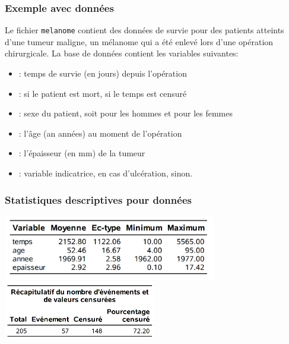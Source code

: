 \documentclass{beamer}
\begin{document}
\begin{frame}
\frametitle{Exemple avec données }
Le fichier \texttt{melanome} contient des données de survie pour des patients atteints d'une tumeur maligne, un mélanome qui a été enlevé lors d'une opération chirurgicale. La base de données contient les variables suivantes:


{ \footnotesize
\begin{itemize}
\itemsep0em 
\item {}: temps de survie (en jours) depuis l'opération 
\item {}:  si le patient est mort,  si le temps est censuré
\item {}: sexe du patient, soit  pour les hommes et  pour les femmes
\item {}: l'âge (an années) au moment de l'opération
\item {}: l'épaisseur (en mm) de la tumeur
\item {}: variable indicatrice,  en cas d'ulcération,  sinon.
\end{itemize}
}

\end{frame}

\begin{frame}
\frametitle{Statistiques descriptives pour données }
\begin{center}
\includegraphics[width = 0.7\textwidth]{img/c7/diapos7e10}
\includegraphics[width = 0.5\textwidth]{img/c7/diapos7e11}
\end{center}
\end{frame}
\end{document}
